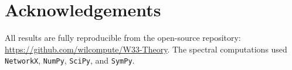 \documentclass[12pt,a4paper]{article}
\begin{document}

\section*{Acknowledgements}

All results are fully reproducible from the open-source repository:
\url{https://github.com/wilcompute/W33-Theory}.
The spectral computations used
\texttt{NetworkX}, \texttt{NumPy}, \texttt{SciPy}, and \texttt{SymPy}.




\end{document}
